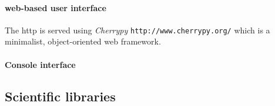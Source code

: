 \paragraph{web-based user interface}

The http is served using \emph{Cherrypy} \texttt{http://www.cherrypy.org/} which
is a minimalist, object-oriented web framework.

\paragraph{Console interface}


\subsection{Scientific libraries}
